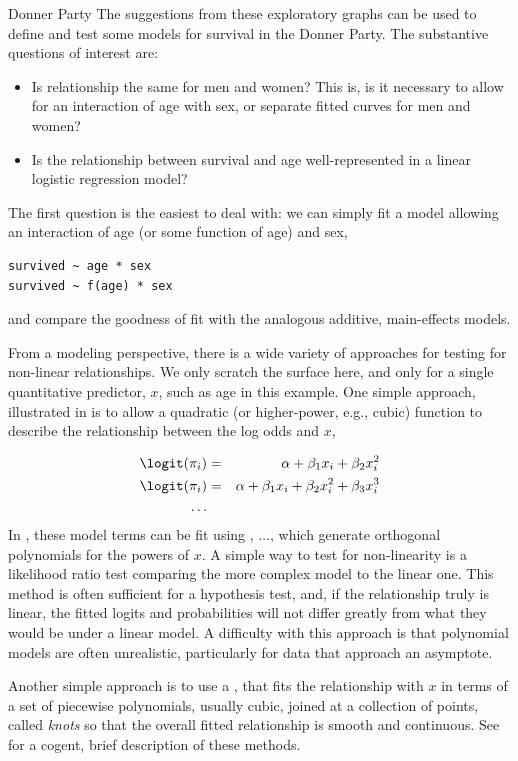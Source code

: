 \documentclass[11pt]{book}
\begin{document}
\begin{Example}[donner1]{Donner Party}
The suggestions from these exploratory graphs can be used to define and test some models
for survival in the Donner Party.  The substantive questions of interest are:
\begin{itemize}
  \item Is relationship the same for men and women?  This is, is it necessary to allow for an interaction of age with sex, or separate fitted curves for men and women?
  \item Is the relationship between survival and age well-represented in a linear logistic regression model?
\end{itemize}

The first question is the easiest to deal with:  we can simply fit a model allowing an
interaction of age (or some function of age) and sex,
\begin{verbatim}
survived ~ age * sex
survived ~ f(age) * sex
\end{verbatim}
and compare the goodness of fit with the analogous additive, main-effects models.

From a modeling perspective, there is a wide variety of approaches for testing for non-linear
relationships. We only scratch the surface here, and only for a single quantitative predictor,
$x$, such as age in this example.
One simple approach, illustrated in  is to allow a quadratic
(or higher-power, e.g., cubic) function to describe the relationship between the log odds
and $x$,

\begin{eqnarray*}
 \logit (\pi_i) & = & \alpha + \beta_1 x_i + \beta_2 x_i^2 \\
 \logit (\pi_i) & = & \alpha + \beta_1 x_i + \beta_2 x_i^2  + \beta_3 x_i^3 \\
 \dots
\end{eqnarray*}
In \R, these model terms can be fit using ,  $\dots$,
which generate orthogonal polynomials for the powers of $x$.  
A simple way to test for non-linearity is a likelihood ratio test comparing the
more complex model to the linear one.  This method is often sufficient for a hypothesis
test, and, if the relationship truly is linear, the fitted logits and probabilities
will not differ greatly from what they would be under a linear model.
A difficulty with this approach is that polynomial models are often unrealistic,
particularly for data that approach an asymptote.

Another  simple approach is to use a ,
that fits the relationship with $x$ in terms of a set of piecewise
polynomials, usually cubic, joined at a collection of points, called \emph{knots}
so that the overall fitted relationship is smooth and continuous.
See \citet[\S 17.2]{Fox:2008} for a cogent, brief description of these methods.


\end{Example}
\end{document}

